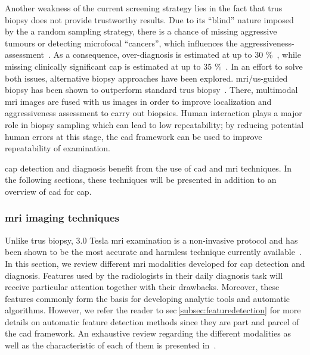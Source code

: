 Another weakness of the current screening strategy lies in the fact that \ac{trus} biopsy does not provide trustworthy results. Due to its ``blind'' nature imposed by the a random sampling strategy, there is a chance of missing aggressive tumours or detecting microfocal ``cancers'', which influences the aggressiveness-assessment~\cite{Noguchi2001}. As a consequence, over-diagnosis is estimated at up to 30 \%~\cite{Haas2007}, while missing clinically significant \ac{cap} is estimated at up to 35 \%~\cite{Taira2010}. In an effort to solve both issues, alternative biopsy approaches have been explored. \ac{mri}/\ac{us}-guided biopsy has been shown to outperform standard \ac{trus} biopsy~\cite{Delongchamps2013}. There, multimodal \ac{mri} images are fused with \ac{us} images in order to improve localization and aggressiveness assessment to carry out biopsies. Human interaction plays a major role in biopsy sampling which can lead to low repeatability; by reducing potential human errors at this stage, the \acs{cad} framework can be used to improve repeatability of examination.

\ac{cap} detection and diagnosis benefit from the use of \acs{cad} and \ac{mri} techniques. In the following sections, these techniques will be presented in addition to an overview of \acs{cad} for \ac{cap}.

\subsubsection{\ac{mri} imaging techniques}\label{subsubsec:mrimrsi}
Unlike \ac{trus} biopsy, 3.0 Tesla \ac{mri} examination is a non-invasive protocol and has been shown to be the most accurate and harmless technique currently available~\cite{Turkbey2012}. In this section, we review different \ac{mri} modalities developed for \ac{cap} detection and diagnosis. Features used by the radiologists in their daily diagnosis task will receive particular attention together with their drawbacks. Moreover, these features commonly form the basis for developing analytic tools and automatic algorithms. However, we refer the reader to \acs{sec}\,\ref{subsec:featuredetection} for more details on automatic feature detection methods since they are part and parcel of the \acs{cad} framework. An exhaustive review regarding the different modalities as well as the characteristic of each of them is presented in~\cite{Barentsz2012}.

